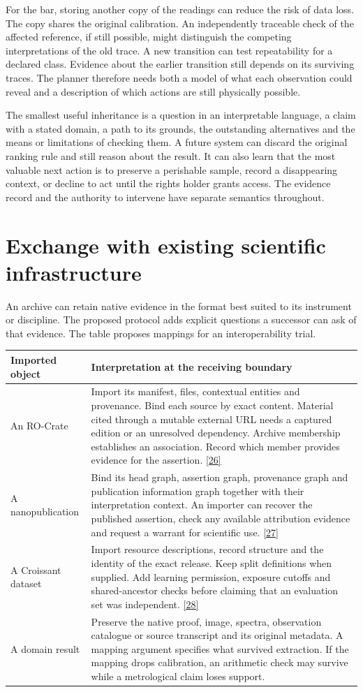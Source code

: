 \documentclass[11pt,a4paper]{article}
\newcommand{\partpage}[1]{\clearpage\section{#1}}
\newcommand{\topic}[1]{\par\smallskip{\sffamily\bfseries\color{ink}#1\par}\nobreak}
\newcommand{\src}[1]{\hyperlink{ref#1}{[#1]}}
\begin{document}
For the bar, storing another copy of the readings can reduce the risk of data loss. The copy shares the original calibration. An independently traceable check of the affected reference, if still possible, might distinguish the competing interpretations of the old trace. A new transition can test repeatability for a declared class. Evidence about the earlier transition still depends on its surviving traces. The planner therefore needs both a model of what each observation could reveal and a description of which actions are still physically possible.

\topic{What a successor needs to recover}
The smallest useful inheritance is a question in an interpretable language, a claim with a stated domain, a path to its grounds, the outstanding alternatives and the means or limitations of checking them. A future system can discard the original ranking rule and still reason about the result. It can also learn that the most valuable next action is to preserve a perishable sample, record a disappearing context, or decline to act until the rights holder grants access. The evidence record and the authority to intervene have separate semantics throughout.

\partpage{Exchange with existing scientific infrastructure}
An archive can retain native evidence in the format best suited to its instrument or discipline. The proposed protocol adds explicit questions a successor can ask of that evidence. The table proposes mappings for an interoperability trial.

\small
\begin{tabularx}{\linewidth}{@{}L{.23\linewidth}Y@{}}
\toprule
\textbf{Imported object} & \textbf{Interpretation at the receiving boundary} \\ \midrule
An RO-Crate & Import its manifest, files, contextual entities and provenance. Bind each source by exact content. Material cited through a mutable external URL needs a captured edition or an unresolved dependency. Archive membership establishes an association. Record which member provides evidence for the assertion. \src{26} \\
A nanopublication & Bind its head graph, assertion graph, provenance graph and publication information graph together with their interpretation context. An importer can recover the published assertion, check any available attribution evidence and request a warrant for scientific use. \src{27} \\
A Croissant dataset & Import resource descriptions, record structure and the identity of the exact release. Keep split definitions when supplied. Add learning permission, exposure cutoffs and shared-ancestor checks before claiming that an evaluation set was independent. \src{28} \\
A domain result & Preserve the native proof, image, spectra, observation catalogue or source transcript and its original metadata. A mapping argument specifies what survived extraction. If the mapping drops calibration, an arithmetic check may survive while a metrological claim loses support. \\
\bottomrule
\end{tabularx}
\normalsize
\end{document}
